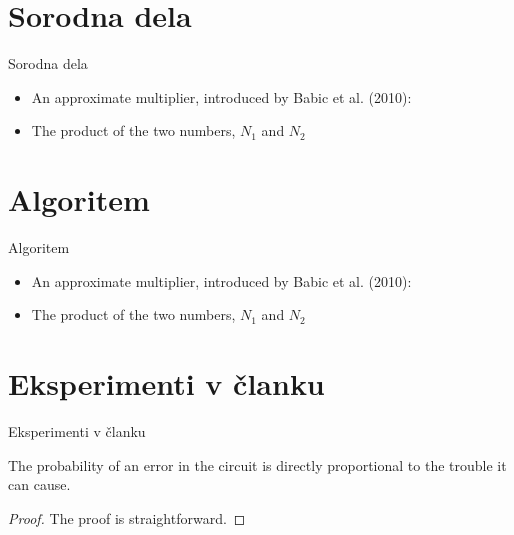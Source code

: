 \documentclass[xcolor=dvipsnames,compress]{beamer}
\begin{document}
\section{Sorodna dela}
\label{sec:sorodna}

\begin{frame}{Sorodna dela}
\begin{itemize}
    \item An approximate multiplier, introduced by Babic et al. (2010):
    \item The product of the two numbers, $N_{1}$ and $N_{2}$ 
\end{itemize}
\end{frame}
%

\section{Algoritem}

\begin{frame}{Algoritem}
\begin{itemize}
    \item An approximate multiplier, introduced by Babic et al. (2010):
    \item The product of the two numbers, $N_{1}$ and $N_{2}$ 
\end{itemize}
\end{frame}

\section{Eksperimenti v članku}
\label{sec:eksoni}

\begin{frame}{Eksperimenti v članku}
\begin{theorem}
  The probability of an error in the circuit is directly proportional
      to the trouble it can cause.
\end{theorem}
\pause
\begin{proof}
 The proof is straightforward.
\end{proof}
\end{frame}
\end{document}
